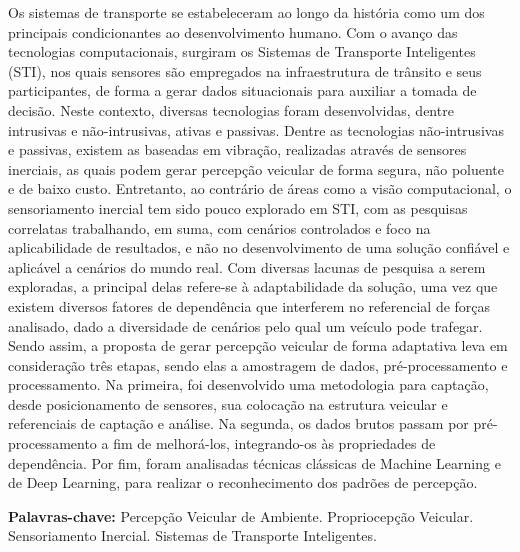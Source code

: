 
\begin{resumo}[Resumo]
    Os sistemas de transporte se estabeleceram ao longo da história como um dos principais condicionantes ao desenvolvimento humano. Com o avanço das tecnologias computacionais, surgiram os Sistemas de Transporte Inteligentes (STI), nos quais sensores são empregados na infraestrutura de trânsito e seus participantes, de forma a gerar dados situacionais para auxiliar a tomada de decisão. Neste contexto, diversas tecnologias foram desenvolvidas, dentre intrusivas e não-intrusivas, ativas e passivas. Dentre as tecnologias não-intrusivas e passivas, existem as baseadas em vibração, realizadas através de sensores inerciais, as quais podem gerar percepção veicular de forma segura, não poluente e de baixo custo. Entretanto, ao contrário de áreas como a visão computacional, o sensoriamento inercial tem sido pouco explorado em STI, com as pesquisas correlatas trabalhando, em suma, com cenários controlados e foco na aplicabilidade de resultados, e não no desenvolvimento de uma solução confiável e aplicável a cenários do mundo real. Com diversas lacunas de pesquisa a serem exploradas, a principal delas refere-se à adaptabilidade da solução, uma vez que existem diversos fatores de dependência que interferem no referencial de forças analisado, dado a diversidade de cenários pelo qual um veículo pode trafegar. Sendo assim, a proposta de gerar percepção veicular de forma adaptativa leva em consideração três etapas, sendo elas a amostragem de dados, pré-processamento e processamento. Na primeira, foi desenvolvido uma metodologia para captação, desde posicionamento de sensores, sua colocação na estrutura veicular e referenciais de captação e análise. Na segunda, os dados brutos passam por pré-processamento a fim de melhorá-los, integrando-os às propriedades de dependência. Por fim, foram analisadas técnicas clássicas de Machine Learning e de Deep Learning, para realizar o reconhecimento dos padrões de percepção.
    
  \vspace{\baselineskip} 
  \textbf{Palavras-chave:} 
  Percepção Veicular de Ambiente. 
  Propriocepção Veicular. 
  Sensoriamento Inercial. 
  Sistemas de Transporte Inteligentes.
  
\end{resumo}
